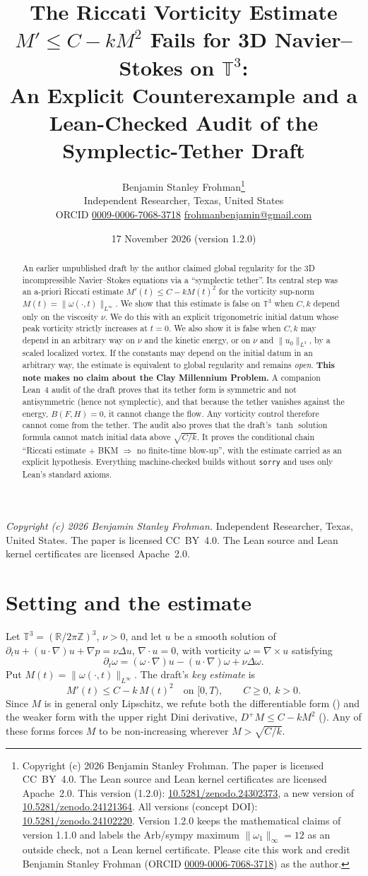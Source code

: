 \documentclass[11pt]{article}
\title{The Riccati Vorticity Estimate $M' \le C - kM^2$ Fails for 3D Navier--Stokes on $\mathbb{T}^3$:\\
An Explicit Counterexample and a Lean-Checked Audit of the Symplectic-Tether Draft}
\author{Benjamin Stanley Frohman\thanks{Copyright (c) 2026 Benjamin Stanley Frohman. The paper is licensed CC~BY~4.0. The Lean source and Lean kernel certificates are licensed Apache~2.0. This version (1.2.0): \href{https://doi.org/10.5281/zenodo.24302373}{10.5281/zenodo.24302373}, a new version of \href{https://doi.org/10.5281/zenodo.24121364}{10.5281/zenodo.24121364}. All versions (concept DOI): \href{https://doi.org/10.5281/zenodo.24102220}{10.5281/zenodo.24102220}. Version 1.2.0 keeps the mathematical claims of version 1.1.0 and labels the Arb/sympy maximum $\|\omega_1\|_\infty=12$ as an outside check, not a Lean kernel certificate. Please cite this work and credit Benjamin Stanley Frohman (ORCID \href{https://orcid.org/0009-0006-7068-3718}{0009-0006-7068-3718}) as the author.}\\
\small Independent Researcher, Texas, United States\\
\small ORCID \href{https://orcid.org/0009-0006-7068-3718}{0009-0006-7068-3718} \quad
\small \href{mailto:frohmanbenjamin@gmail.com}{frohmanbenjamin@gmail.com}}
\date{17 November 2026 \quad (version 1.2.0)}
\newcommand{\T}{\mathbb{T}^3}
\newcommand{\R}{\mathbb{R}}
\theoremstyle{remark}
\newcommand{\lean}[1]{\path{#1}}
\begin{document}
\maketitle
\noindent\textit{Copyright (c) 2026 Benjamin Stanley Frohman.} Independent Researcher, Texas, United States. The paper is licensed CC~BY~4.0. The Lean source and Lean kernel certificates are licensed Apache~2.0.



\begin{abstract}
An earlier unpublished draft by the author claimed global regularity for the 3D incompressible
Navier--Stokes equations via a ``symplectic tether''. Its central step was an a-priori Riccati estimate
$M'(t)\le C-kM(t)^2$ for the vorticity sup-norm $M(t)=\|\omega(\cdot,t)\|_{L^\infty}$. We show that this estimate is
false on $\T$ when $C,k$ depend only on the viscosity $\nu$. We do this with an explicit trigonometric initial
datum whose peak vorticity strictly increases at $t=0$. We also show it is false when $C,k$ may depend in an
arbitrary way on $\nu$ and the kinetic energy, or on $\nu$ and $\|u_0\|_{L^3}$, by a scaled localized vortex. If the constants may
depend on the initial datum in an arbitrary way, the estimate is equivalent to global regularity and remains
\emph{open}. \textbf{This note makes no claim about the Clay Millennium Problem.} A companion Lean~4 audit of the draft proves that its
tether form is symmetric and not antisymmetric (hence not symplectic), and that because the tether vanishes against the
energy, $B(F,H)=0$, it cannot change the flow. Any vorticity control therefore cannot come from the tether. The audit
also proves that the draft's $\tanh$ solution formula cannot match initial data above $\sqrt{C/k}$. It proves
the conditional chain ``Riccati estimate $+$ BKM $\Rightarrow$ no finite-time blow-up'', with the estimate
carried as an explicit hypothesis. Everything machine-checked builds without \texttt{sorry} and uses only
Lean's standard axioms.
\end{abstract}

\section{Setting and the estimate}
Let $\T=(\R/2\pi\mathbb{Z})^3$, $\nu>0$, and let $u$ be a smooth solution of
$\partial_t u+(u\cdot\nabla)u+\nabla p=\nu\Delta u$, $\nabla\cdot u=0$, with vorticity $\omega=\nabla\times u$ satisfying
\begin{equation}\label{eq:vort}
\partial_t\omega=(\omega\cdot\nabla)u-(u\cdot\nabla)\omega+\nu\Delta\omega .
\end{equation}
Put $M(t)=\|\omega(\cdot,t)\|_{L^\infty}$. The draft's \emph{key estimate} is
\begin{equation}\label{eq:key}
M'(t)\le C-k\,M(t)^2\quad\text{on }[0,T),\qquad C\ge0,\ k>0 .
\end{equation}
Since $M$ is in general only Lipschitz, we refute both the differentiable form (\lean{DraftRiccatiEstimate})
and the weaker form with the upper right Dini derivative, $D^+M\le C-kM^2$ (\lean{DiniRiccatiEstimate}). Any
of these forms forces $M$ to be non-increasing wherever $M>\sqrt{C/k}$.
\end{document}
